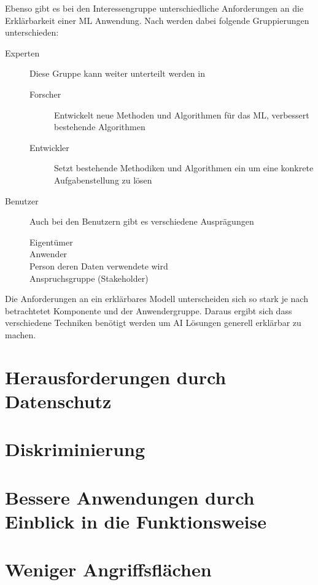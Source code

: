\documentclass[
  12pt, %
  a4paper, %
  oneside, %
  openany, 
  numbers=noenddot, %
  BCOR=5mm, %
  parskip=half*, %
  thesis, %
]{bfhbook}
\begin{document}
Ebenso gibt es bei den Interessengruppe unterschiedliche Anforderungen an die Erklärbarkeit einer ML Anwendung. Nach \parencite{Ras2018} werden dabei folgende Gruppierungen unterschieden:
\begin{description}
  \item[Experten]
  Diese Gruppe kann weiter unterteilt werden in
  	\begin{description}
  		\item[Forscher] Entwickelt neue Methoden und Algorithmen für das ML, verbessert bestehende Algorithmen
  		\item[Entwickler] Setzt bestehende Methodiken und Algorithmen ein um eine konkrete Aufgabenstellung zu lösen
	\end{description}
  \item[Benutzer]
  Auch bei den Benutzern gibt es verschiedene Ausprägungen
  	\begin{description}
  		\item[Eigentümer]
  		\item[Anwender]
  		\item[Person deren Daten verwendete wird]
  		\item[Anspruchsgruppe (Stakeholder)]
	\end{description}
\end{description}
Die Anforderungen an ein erklärbares Modell unterscheiden sich so stark je nach betrachtetet Komponente und der Anwendergruppe. Daraus ergibt sich dass verschiedene Techniken benötigt werden um AI Lösungen generell erklärbar zu machen.

\section{Herausforderungen durch Datenschutz}

\section{Diskriminierung}

\section{Bessere Anwendungen durch Einblick in die Funktionsweise}

\section{Weniger Angriffsflächen}
\end{document}
